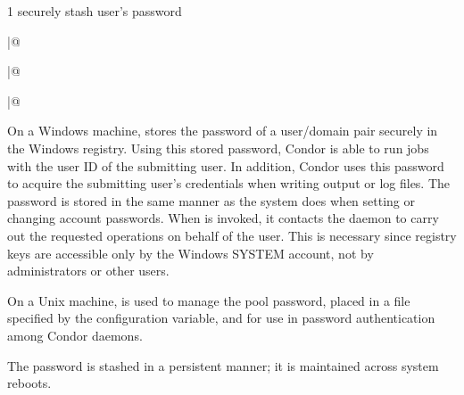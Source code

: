 \begin{ManPage}{\label{man-condor-store-cred}}{1}
{securely stash user's password}
\Synopsis
{}

\Lbr
{} \verb@|@ 
\Rbr 
{}

\Lbr
{} \verb@|@ 
\Rbr 
{}

\Lbr
{} \verb@|@ 
\Rbr 
{}


\Description 

On a Windows machine,  stores the password
of a user/domain pair securely in the Windows registry.
Using this stored password, Condor is able to
run jobs with the user ID of the submitting user.
In addition, Condor uses this password to
acquire the submitting user's credentials when writing output or log
files. The password is stored in the same manner as the system does when
setting or changing account passwords.
When  is invoked, it contacts the 
daemon to carry out the requested operations on behalf of the user.
This is necessary since registry keys are accessible only by the Windows
SYSTEM account, not by administrators or other users.

On a Unix machine,  is used to manage
the pool password,
placed in a file specified by the 
configuration variable, and for use in password authentication
among Condor daemons.


The password is stashed in a persistent manner; it is maintained
across system reboots.

\begin{Options}




\end{Options}
\end{ManPage}

